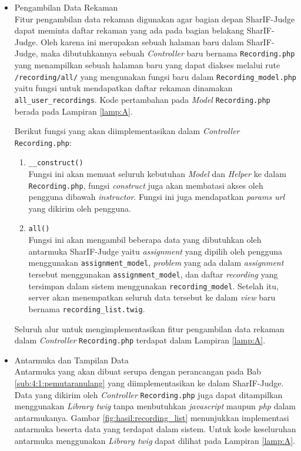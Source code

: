 \begin{itemize}
    \item Pengambilan Data Rekaman \\
    Fitur pengambilan data rekaman digunakan agar bagian depan SharIF-Judge dapat meminta daftar rekaman yang ada pada bagian belakang SharIF-Judge. Oleh karena ini merupakan sebuah halaman baru dalam SharIF-Judge, maka dibutuhkannya sebuah \textit{Controller} baru bernama \verb|Recording.php| yang menampilkan sebuah halaman baru yang dapat diakses melalui rute \verb|/recording/all/| yang mengunakan fungsi baru dalam \verb|Recording_model.php| yaitu fungsi untuk mendapatkan daftar rekaman dinamakan \verb|all_user_recordings|. Kode pertambahan pada \textit{Model} \verb|Recording.php| berada pada Lampiran \ref{lamp:A}.

    Berikut fungsi yang akan diimplementasikan dalam \textit{Controller} \verb|Recording.php|:
    \begin{enumerate}
        \item \verb|__construct()| \\
        Fungsi ini akan memuat seluruh kebutuhan \textit{Model} dan \textit{Helper} ke dalam \verb|Recording.php|, fungsi \textit{construct} juga akan membatasi akses oleh pengguna dibawah \textit{instructor}. Fungsi ini juga mendapatkan \textit{params url} yang dikirim oleh pengguna. 

        \item \verb|all()| \\
        Fungsi ini akan mengambil beberapa data yang dibutuhkan oleh antarmuka SharIF-Judge yaitu \textit{assignment} yang dipilih oleh pengguna menggunakan \verb|assignment_model|, \textit{problem} yang ada dalam \textit{assignment} tersebut menggunakan \verb|assignment_model|, dan daftar \textit{recording} yang tersimpan dalam sistem menggunakan \verb|recording_model|. Setelah itu, server akan menempatkan seluruh data tersebut ke dalam \textit{view} baru bernama \verb|recording_list.twig|.
    \end{enumerate}

    Seluruh alur untuk mengimplementasikan fitur pengambilan data rekaman dalam \textit{Controller} \verb|Recording.php| terdapat dalam Lampiran \ref{lamp:A}.

    \item Antarmuka dan Tampilan Data \\
    Antarmuka yang akan dibuat serupa dengan perancangan pada Bab \ref{sub:4:1:pemutaranulang} yang diimplementasikan ke dalam SharIF-Judge. Data yang dikirim oleh \textit{Controller} \verb|Recording.php| juga dapat ditampilkan menggunakan \textit{Library twig} tanpa menbutuhkan \textit{javascript} maupun \textit{php} dalam antarmukanya. Gambar \ref{fig:hasil:recording_list} menunjukkan implementasi antarmuka beserta data yang terdapat dalam sistem. Untuk kode keseluruhan antarmuka menggunakan \textit{Library twig} dapat dilihat pada Lampiran \ref{lamp:A}.
\end{itemize}


